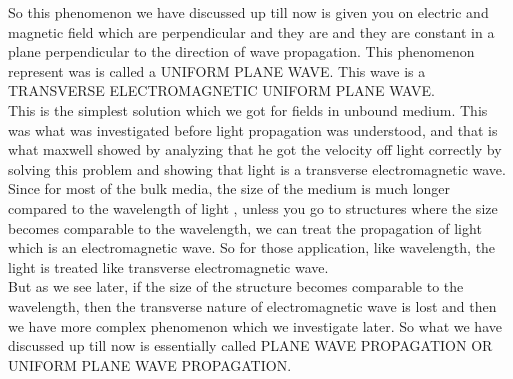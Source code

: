 So this phenomenon we have discussed up till now is given you on electric and magnetic field which are perpendicular and they are and they are constant in a plane perpendicular to the direction of wave propagation. This phenomenon represent was is called a UNIFORM PLANE WAVE. This wave is a TRANSVERSE ELECTROMAGNETIC UNIFORM PLANE WAVE.\\

This is the simplest solution which we got for fields in unbound medium. This was what was investigated before light propagation was understood, and that is what maxwell showed by analyzing that he got the velocity off light correctly by solving this problem and showing that light is a transverse electromagnetic wave. Since for most of the bulk media, the size of the medium is much longer compared to the wavelength of light , unless you go to structures where the size becomes comparable to the wavelength, we can treat the propagation of light which is an electromagnetic wave. So for those application, like wavelength, the light is treated like transverse electromagnetic wave. \\

But as we see later, if the size of the structure becomes comparable to the wavelength, then the transverse nature of electromagnetic wave is lost and then we have more complex phenomenon which we investigate later. So what we have discussed up till now is essentially called PLANE WAVE PROPAGATION OR UNIFORM PLANE WAVE PROPAGATION.
\\

